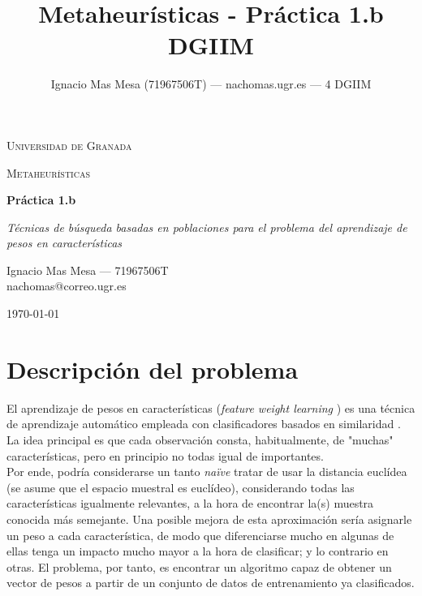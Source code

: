\documentclass[11pt]{article}
\theoremstyle{plain}
\theoremstyle{definition}
\begin{document}
\title{Metaheurísticas - Práctica 1.b \\
  DGIIM}

\date{}
\author{Ignacio Mas Mesa (71967506T) --- nachomas\@correo.ugr.es --- 4 DGIIM}

\begin{titlepage}
	\centering
	{\scshape\LARGE Universidad de Granada \par}
	\vspace{1cm}
	{\scshape\Large Metaheurísticas \par}
	\vspace{1.5cm}
	{\huge\bfseries Práctica 1.b \par}
	\vspace{1cm}
	{\Large\itshape Técnicas de búsqueda basadas en poblaciones para el problema
  del aprendizaje de pesos en características \par}
	\vfill

        Ignacio Mas Mesa --- 71967506T \\
        nachomas@correo.ugr.es
	\vfill

	{\large \today\par}
      \end{titlepage}

\tableofcontents

\section{Descripción del problema}

El aprendizaje de pesos en características (\textit{feature weight
  learning} \cite{svm}) es una técnica de aprendizaje automático empleada con
clasificadores basados en similaridad \cite{similarity}. La idea principal es que
cada observación consta, habitualmente, de "muchas" características,
pero en principio no todas igual de importantes. \\


Por ende, podría
considerarse un tanto \textit{naïve} tratar de usar la distancia
euclídea (se asume que el
espacio muestral es euclídeo), considerando todas las características
igualmente relevantes, a la hora de encontrar la(s) muestra conocida más
semejante. Una posible mejora de esta aproximación sería asignarle un
peso a cada característica, de modo que diferenciarse mucho en algunas
de ellas tenga un impacto mucho mayor a la hora de clasificar; y lo
contrario en otras. El problema, por tanto, es encontrar un algoritmo
capaz de obtener un vector de pesos a partir de un conjunto de datos
de entrenamiento ya clasificados. \\
\end{document}
